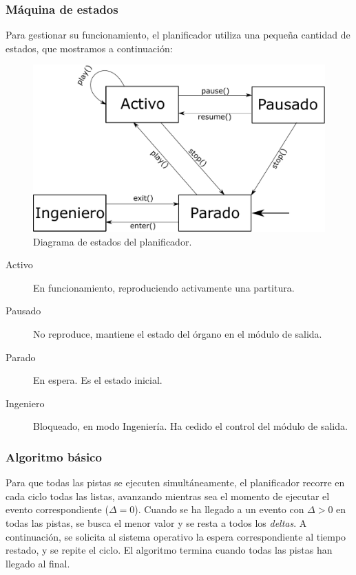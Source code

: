 \subsubsection{Máquina de estados}

Para gestionar su funcionamiento, el planificador utiliza una pequeña cantidad de estados, que mostramos a continuación:

\smallskip

\begin{figure}[H]
	\noindent \begin{centering}
		\includegraphics[width=\linewidth/2]{capitulo4/sched}
		\par\end{centering}
	\smallskip
	\caption{\label{fig:sched} Diagrama de estados del planificador.}
\end{figure} 

\smallskip

\begin{description}
	\item[Activo] En funcionamiento, reproduciendo activamente una partitura.
	\item[Pausado] No reproduce, mantiene el estado del órgano en el módulo de salida.
	\item[Parado] En espera. Es el estado inicial.
	\item[Ingeniero] Bloqueado, en modo Ingeniería. Ha cedido el control del módulo de salida.
\end{description}

\subsubsection{Algoritmo básico}

Para que todas las pistas se ejecuten simultáneamente, el planificador recorre en cada ciclo todas las listas, avanzando mientras sea el momento de ejecutar el evento correspondiente ($\Delta=0$). Cuando se ha llegado a un evento con $\Delta > 0$ en todas las pistas, se busca el menor valor y se resta a todos los \textit{deltas}. A continuación, se solicita al sistema operativo la espera correspondiente al tiempo restado, y se repite el ciclo. El algoritmo termina cuando todas las pistas han llegado al final.

